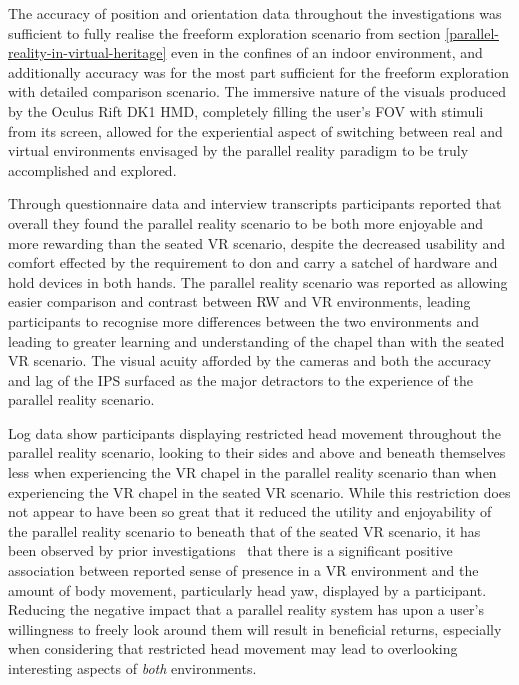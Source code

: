 The accuracy of position and orientation data throughout the investigations was sufficient to fully realise the freeform exploration scenario from section \ref{parallel-reality-in-virtual-heritage} even in the confines of an indoor environment, and additionally accuracy was for the most part sufficient for the freeform exploration with detailed comparison scenario. The immersive nature of the visuals produced by the Oculus Rift DK1 HMD, completely filling the user's FOV with stimuli from its screen, allowed for the experiential aspect of switching between real and virtual environments envisaged by the parallel reality paradigm to be truly accomplished and explored.

Through questionnaire data and interview transcripts participants reported that overall they found the parallel reality scenario to be both more enjoyable and more rewarding than the seated VR scenario, despite the decreased usability and comfort effected by the requirement to don and carry a satchel of hardware and hold devices in both hands. The parallel reality scenario was reported as allowing easier comparison and contrast between RW and VR environments, leading participants to recognise more differences between the two environments and leading to greater learning and understanding of the chapel than with the seated VR scenario. The visual acuity afforded by the cameras and both the accuracy and lag of the IPS surfaced as the major detractors to the experience of the parallel reality scenario.

Log data show participants displaying restricted head movement throughout the parallel reality scenario, looking to their sides and above and beneath themselves less when experiencing the VR chapel in the parallel reality scenario than when experiencing the VR chapel in the seated VR scenario. While this restriction does not appear to have been so great that it reduced the utility and enjoyability of the parallel reality scenario to beneath that of the seated VR scenario, it has been observed by prior investigations~\cite{Slater1998} that there is a significant positive association between reported sense of presence in a VR environment and the amount of body movement, particularly head yaw, displayed by a participant. Reducing the negative impact that a parallel reality system has upon a user's willingness to freely look around them will result in beneficial returns, especially when considering that restricted head movement may lead to overlooking interesting aspects of \textit{both} environments.

